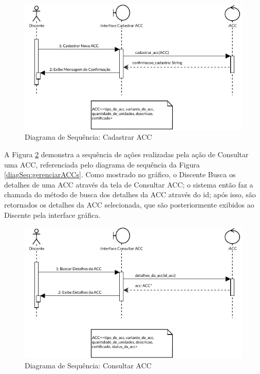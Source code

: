 \begin{figure}[H]
    \centering 
    \includegraphics[width=\textwidth]{dados/figuras/Proposta/DiagramasDeSequencia/Gerenciar ACCs_ Completo-Cadastrar ACC.pdf}
    \caption{Diagrama de Sequência: Cadastrar ACC}
    \label{diagSeq:cadastrarACC}
\end{figure}

A Figura \ref{diagSeq:consultarACC} demonstra a sequência de ações realizadas pela ação de Consultar uma ACC, referenciada pelo diagrama de sequência da Figura \ref{diagSeq:gerenciarACCs}. Como mostrado no gráfico, o Discente Busca os detalhes de uma ACC através da tela de Consultar ACC; o sistema então faz a chamada do método de busca dos detalhes da ACC através do id; após isso, são retornados os detalhes da ACC selecionada, que são posteriormente exibidos ao Discente pela interface gráfica.

\begin{figure}[H]
    \centering 
    \includegraphics[width=\textwidth]{dados/figuras/Proposta/DiagramasDeSequencia/Gerenciar ACCs_ Completo-Consultar ACC.pdf}
    \caption{Diagrama de Sequência: Consultar ACC}
    \label{diagSeq:consultarACC}
\end{figure}

